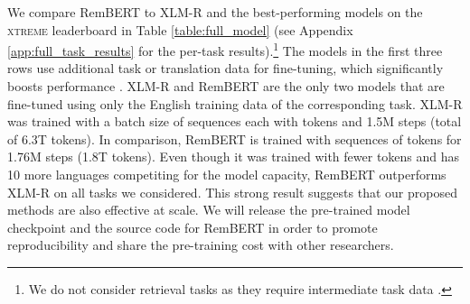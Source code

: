 \documentclass{article} \usepackage{iclr2021_conference,times}
\newcommand{\xtreme}{\textsc{xtreme}\xspace}
\begin{document}
We compare RemBERT to XLM-R and the best-performing models on the \xtreme leaderboard in Table \ref{table:full_model} (see Appendix \ref{app:full_task_results} for the per-task results).\footnote{We do not consider retrieval tasks as they require intermediate task data \citep{phang2020english}.} The models in the first three rows use additional task or translation data for fine-tuning, which significantly boosts performance \citep{Hu2020}. XLM-R and RemBERT are the only two models that are fine-tuned using only the English training data of the corresponding task. XLM-R was trained with a batch size of  sequences each with  tokens and 1.5M steps (total of 6.3T tokens). In comparison, RemBERT is trained with  sequences of  tokens for 1.76M steps (1.8T tokens). Even though it was trained with  fewer tokens and has 10 more languages competiting for the model capacity, RemBERT outperforms XLM-R on all tasks we considered. This strong result suggests that our proposed methods are also effective at scale.
We will release the pre-trained model checkpoint and the source code for RemBERT in order to promote reproducibility and share the pre-training cost with other researchers.
\end{document}
